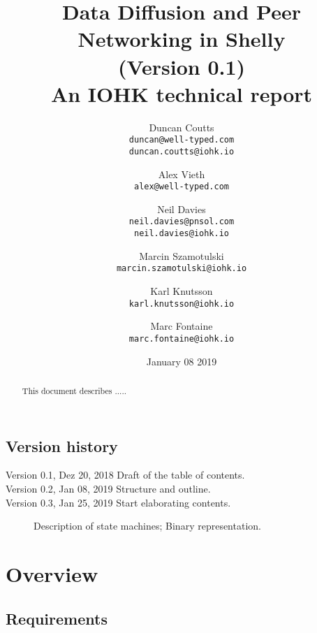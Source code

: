 \documentclass{report}
\theoremstyle{definition}{
  \newtheorem{lemma}{Lemma}[section] %
  \newtheorem{definition}[lemma]{Definition}
}
\theoremstyle{theorem}{
  \newtheorem{invariant}[lemma]{Invariant}
  \newtheorem{proofobligation}[lemma]{Proof Obligation}
}
\numberwithin{equation}{lemma}
\begin{document}
\title{Data Diffusion and Peer Networking in Shelly\\
       {\small (Version 0.1)} \\
       {\large \sc An IOHK technical report}}
\author{Duncan Coutts \\ {\small \texttt{duncan@well-typed.com}} \\
                         {\small \texttt{duncan.coutts@iohk.io}}
   \and Alex Vieth \\ {\small \texttt{alex@well-typed.com}}
   \and Neil Davies \\ {\small \texttt{neil.davies@pnsol.com}} \\
                       {\small \texttt{neil.davies@iohk.io}}
   \and Marcin Szamotulski \\ {\small \texttt{marcin.szamotulski@iohk.io}}
   \and Karl Knutsson \\ {\small \texttt{karl.knutsson@iohk.io}}
   \and Marc Fontaine \\ {\small \texttt{marc.fontaine@iohk.io}}
   }
\date{January 08 2019}

\maketitle

\begin{abstract}
  This document describes .....
\end{abstract}

\tableofcontents

\section*{Version history}

\begin{description}
\item[Version 0.1, Dez 20, 2018  Draft of the table of contents.]
\item[Version 0.2, Jan 08, 2019 Structure and outline.]
\item[Version 0.3, Jan 25, 2019 Start elaborating contents.]
  Description of state machines; Binary representation.
\end{description}

\chapter{Overview}
\section{Requirements}
\end{document}
